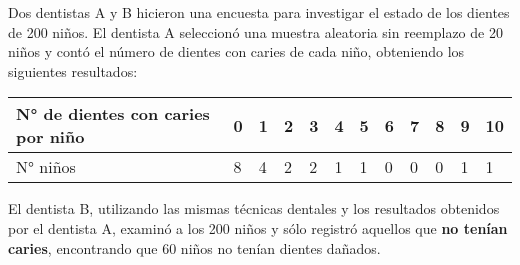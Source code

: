 
\addpoints
\question[20] Dos dentistas A y B hicieron una encuesta para investigar el estado de los dientes de 200 niños. El dentista A seleccionó una muestra aleatoria sin reemplazo de 20 niños y contó el número de dientes con
caries de cada niño, obteniendo los siguientes resultados:

\begin{table}[h!]
\centering
\begin{tabular}{l|lllllllllll}
N° de dientes con caries por niño & 0 & 1 & 2 & 3 & 4 & 5 & 6 & 7 & 8 & 9 & 10 \\ \hline
N° niños                          & 8 & 4 & 2 & 2 & 1 & 1 & 0 & 0 & 0 & 1 & 1 
\end{tabular}
\end{table}

El dentista B, utilizando las mismas técnicas dentales y los resultados obtenidos por el dentista A, examinó a los 200 niños y sólo registró aquellos que \textbf{no tenían caries}, encontrando que 60 niños no tenían dientes dañados.\\

\noaddpoints
{}

